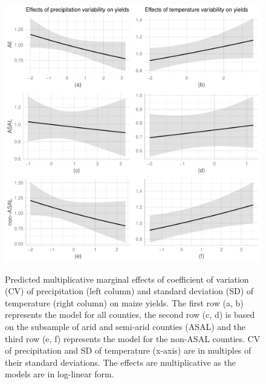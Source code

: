\documentclass[12pt]{iopart}
\begin{document}
  \begin{figure}
   \includegraphics{Figure2a_2f.pdf}\label{MarEff2}
\caption{Predicted multiplicative marginal effects of coefficient of variation (CV) of precipitation (left column) and standard deviation (SD) of temperature (right column) on maize yields. The first row (a, b) represents the model for all counties, the second row (c, d) is based on the subsample of arid and semi-arid counties (ASAL) and the third row (e, f) represents the model for the non-ASAL counties. CV of precipitation and SD of temperature (x-axis) are in multiples of their standard deviations. The effects are multiplicative as the models are in log-linear form.}
\end{figure}
\end{document}
